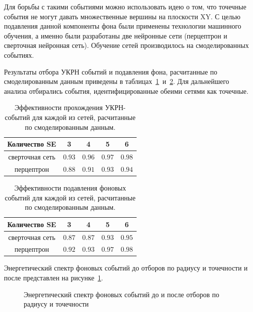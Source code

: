 Для борьбы с такими событиями можно использовать идею о том, что точечные события не могут давать множественные вершины на плоскости XY. С целью подавления данной компоненты фона были применены технологии машинного обучения, а именно были разработаны две нейронные сети (перцептрон и сверточная нейронная сеть). Обучение сетей производилось на смоделированных событиях.

Результаты отбора УКРН событий и подавления фона, расчитанные по смоделированным данным приведены в таблицах~\ref{NNeffcevns}~и~\ref{NNeffbckg}. Для дальнейшего анализа отбирались события, идентифицированные обеими сетями как точечные.

\begin{table}[h]
    \centering
    \caption{Эффективности прохождения УКРН-событий для каждой из сетей, расчитанные по смоделированным данным.}  
\begin{tabular}{|c|c|c|c|c|}
\hline Количество SE & 3 & 4 & 5 & 6 \\
\hline сверточная сеть & $0.93$ & $0.96$ & $0.97$ & $0.98$ \\
\hline перцептрон & $0.88$ & $0.91$ & $0.93$ & $0.94$ \\
\hline
\end{tabular}
\label{NNeffcevns}
\end{table}

\begin{table}[h]
    \centering
    \caption{Эффективности подавления фоновых событий для каждой из сетей, расчитанные по смоделированным данным.}  
\begin{tabular}{|c|c|c|c|c|}
\hline Количество SE & 3 & 4 & 5 & 6 \\
\hline сверточная сеть & $0.87$ & $0.87$ & $0.93$ & $0.95$ \\
\hline перцептрон & $0.92$ & $0.93$ & $0.97$ & $0.98$ \\
\hline
\end{tabular}
\label{NNeffbckg}
\end{table}

Энергетический спектр фоновых событий до отборов по радиусу и точечности и после представлен на рисунке~\ref{img:bckgspecrtum}.
\begin{figure}[h]
	\caption{Энергетический спектр фоновых событий до и после отборов по радиусу и точечности}
	\label{img:bckgspecrtum}
\end{figure}

